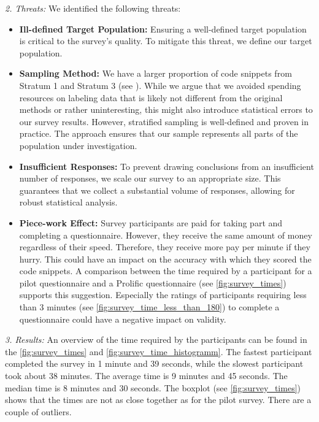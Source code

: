 \documentclass[%
class=scrreprt,
chapterprefix=false,%
open=right,%
twoside=false,%
paper=a4,%
logofile={Logo\_zentral\_farbig\_EN.png},%
thesistype=master,%
UKenglish,%
]{se2thesis}
\theoremstyle{definition}
\begin{document}
\textit{2. Threats:}
	We identified the following threats:
	\begin{itemize}
		\item \textbf{Ill-defined Target Population:} Ensuring a well-defined target population is critical to the survey's quality. To mitigate this threat, we define our target population.
		
		\item \textbf{Sampling Method:} We have a larger proportion of code snippets from Stratum 1 and Stratum 3 (see ). While we argue that we avoided spending resources on labeling data that is likely not different from the original methods or rather uninteresting, this might also introduce statistical errors to our survey results.
		However, stratified sampling is well-defined and proven in practice. The approach ensures that our sample represents all parts of the population under investigation.
		
		\item \textbf{Insufficient Responses:} To prevent drawing conclusions from an insufficient number of responses, we scale our survey to an appropriate size. This guarantees that we collect a substantial volume of responses, allowing for robust statistical analysis.
		
		\item \textbf{Piece-work Effect:} Survey participants are paid for taking part and completing a questionnaire. However, they receive the same amount of money regardless of their speed. Therefore, they receive more pay per minute if they hurry. This could have an impact on the accuracy with which they scored the code snippets. A comparison between the time required by a participant for a pilot questionnaire and a Prolific questionnaire (see \autoref{fig:survey_times}) supports this suggestion. Especially the ratings of participants requiring less than 3 minutes (see \autoref{fig:survey_time_less_than_180}) to complete a questionnaire could have a negative impact on validity. 
		
	\end{itemize}
	
\textit{3. Results:}
	An overview of the time required by the participants can be found in the \autoref{fig:survey_times} and \autoref{fig:survey_time_histogramm}.
	The fastest participant completed the survey in 1 minute and 39 seconds, while the slowest participant took about 38 minutes. 
	The average time is 9 minutes and 45 seconds. The median time is 8 minutes and 30 seconds. The boxplot (see \autoref{fig:survey_times}) shows that the times are not as close together as for the pilot survey. There are a couple of outliers.
		
\end{document}
